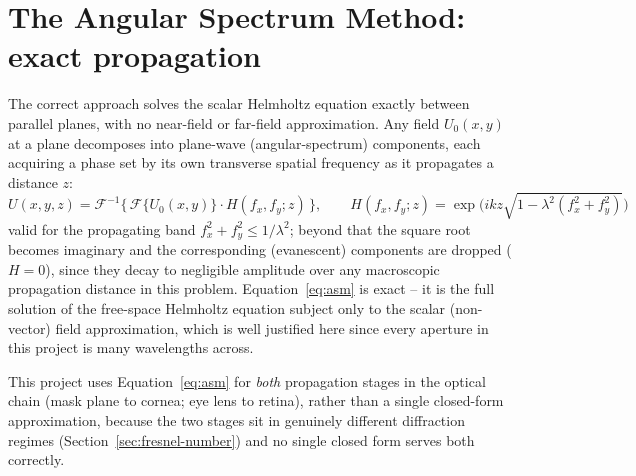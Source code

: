 \section{The Angular Spectrum Method: exact propagation}
\label{sec:asm}
The correct approach solves the scalar Helmholtz equation exactly between parallel
planes, with no near-field or far-field approximation. Any field $U_0(x,y)$ at a plane
decomposes into plane-wave (angular-spectrum) components, each acquiring a phase set by
its own transverse spatial frequency as it propagates a distance $z$:
\begin{equation}
U(x,y,z) = \mathcal{F}^{-1}\Big\{\,\mathcal{F}\{U_0(x,y)\}\cdot H(f_x,f_y;z)\,\Big\},
\qquad
H(f_x,f_y;z) = \exp\!\Big(ikz\sqrt{1-\lambda^2(f_x^2+f_y^2)}\Big)
\label{eq:asm}
\end{equation}
valid for the propagating band $f_x^2+f_y^2 \le 1/\lambda^2$; beyond that the square
root becomes imaginary and the corresponding (evanescent) components are dropped
($H=0$), since they decay to negligible amplitude over any macroscopic propagation
distance in this problem. Equation~\ref{eq:asm} is exact -- it is the full solution of
the free-space Helmholtz equation subject only to the scalar (non-vector) field
approximation, which is well justified here since every aperture in this project is
many wavelengths across.

This project uses Equation~\ref{eq:asm} for \emph{both} propagation stages in the
optical chain (mask plane to cornea; eye lens to retina), rather than a single
closed-form approximation, because the two stages sit in genuinely different
diffraction regimes (Section~\ref{sec:fresnel-number}) and no single closed form serves
both correctly.

